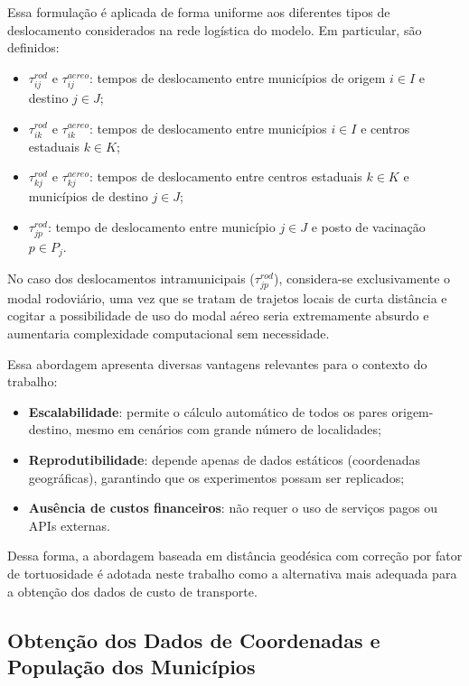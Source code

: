 Essa formulação é aplicada de forma uniforme aos diferentes tipos de deslocamento considerados na rede logística do modelo. Em particular, são definidos:

\begin{itemize}
    \item $\tau_{ij}^{rod}$ e $\tau_{ij}^{aereo}$: tempos de deslocamento entre municípios de origem $i \in I$ e destino $j \in J$;
    \item $\tau_{ik}^{rod}$ e $\tau_{ik}^{aereo}$: tempos de deslocamento entre municípios $i \in I$ e centros estaduais $k \in K$;
    \item $\tau_{kj}^{rod}$ e $\tau_{kj}^{aereo}$: tempos de deslocamento entre centros estaduais $k \in K$ e municípios de destino $j \in J$;
    \item $\tau_{jp}^{rod}$: tempo de deslocamento entre município $j \in J$ e posto de vacinação $p \in P_j$.
\end{itemize}

No caso dos deslocamentos intramunicipais ($\tau_{jp}^{rod}$), considera-se exclusivamente o modal rodoviário, uma vez que se tratam de trajetos locais de curta distância e cogitar a possibilidade de uso do modal aéreo seria extremamente absurdo e aumentaria complexidade computacional sem necessidade.

Essa abordagem apresenta diversas vantagens relevantes para o contexto do trabalho:

\begin{itemize}
    \item \textbf{Escalabilidade}: permite o cálculo automático de todos os pares origem-destino, mesmo em cenários com grande número de localidades;
    \item \textbf{Reprodutibilidade}: depende apenas de dados estáticos (coordenadas geográficas), garantindo que os experimentos possam ser replicados;
    \item \textbf{Ausência de custos financeiros}: não requer o uso de serviços pagos ou APIs externas.
\end{itemize}

Dessa forma, a abordagem baseada em distância geodésica com correção por fator de tortuosidade é adotada neste trabalho como a alternativa mais adequada para a obtenção dos dados de custo de transporte.



\subsection{Obtenção dos Dados de Coordenadas e População dos Municípios}

